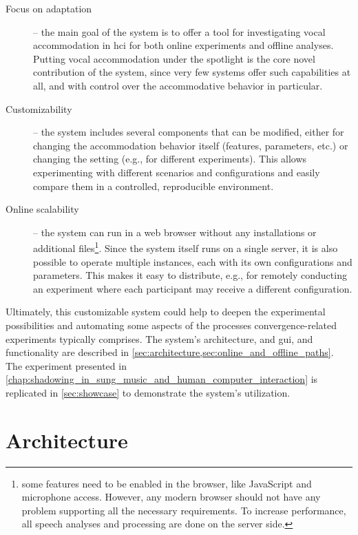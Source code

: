 \begin{description}
	\item[Focus on adaptation] --
	the main goal of the system is to offer a tool for investigating vocal accommodation in \ac{hci} for both online experiments and offline analyses.
	Putting vocal accommodation under the spotlight is the core novel contribution of the system, since very few systems offer such capabilities at all, and with control over the accommodative behavior in particular.
	
	\item[Customizability] --
	the system includes several components that can be modified, either for changing the accommodation behavior itself (features, parameters, etc.) or changing the setting (e.g., for different experiments).
	This allows experimenting with different scenarios and configurations and easily compare them in a controlled, reproducible environment.
	
	\item[Online scalability] --
	the system can run in a web browser without any installations or additional files\footnote{some features need to be enabled in the browser, like JavaScript and microphone access.
	However, any modern browser should not have any problem supporting all the necessary requirements.
	To increase performance, all speech analyses and processing are done on the server side.}.
	Since the system itself runs on a single server, it is also possible to operate multiple instances, each with its own configurations and parameters.
	This makes it easy to distribute, e.g., for remotely conducting an experiment where each participant may receive a different configuration.
\end{description}
%
Ultimately, this customizable system could help to deepen the experimental possibilities and automating some aspects of the processes convergence-related experiments typically comprises.
The system's architecture, and \ac{gui}, and functionality are described in \cref{sec:architecture,sec:online_and_offline_paths}.
The experiment presented in \cref{chap:shadowing_in_sung_music_and_human_computer_interaction} is replicated in \cref{sec:showcase} to demonstrate the system's utilization.

\section{Architecture}
\label{sec:architecture}

